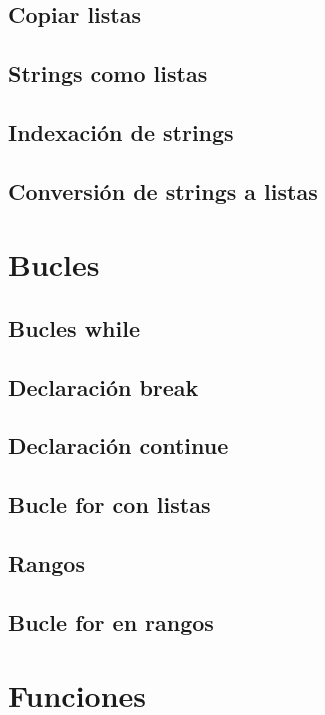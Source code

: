 \documentclass{article}
\begin{document}
\subsection{Copiar listas}

\subsection{Strings como listas}

\subsection{Indexación de strings}

\subsection{Conversión de strings a listas}

\newpage\section{Bucles}

\subsection{Bucles while}

\subsection{Declaración break}

\subsection{Declaración continue}

\subsection{Bucle for con listas}

\subsection{Rangos}

\subsection{Bucle for en rangos}

\newpage\section{Funciones}
\end{document}
